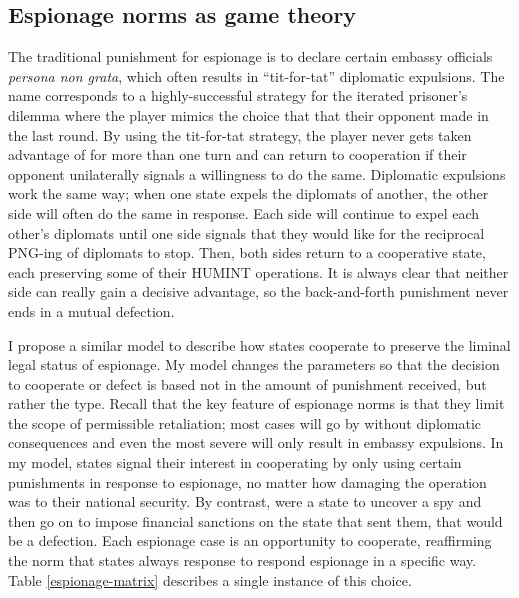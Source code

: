 \documentclass{memoir}
\begin{document}
\begin{refsegment}
\subsection{Espionage norms as game theory}
The traditional punishment for espionage is to declare certain embassy officials \emph{persona non grata}, which often results in ``tit-for-tat'' diplomatic expulsions. The name corresponds to a highly-successful strategy for the iterated prisoner's dilemma where the player mimics the choice that that their opponent made in the last round. By using the tit-for-tat strategy, the player never gets taken advantage of for more than one turn and can return to cooperation if their opponent unilaterally signals a willingness to do the same. Diplomatic expulsions work the same way; when one state expels the diplomats of another, the other side will often do the same in response. Each side will continue to expel each other's diplomats until one side signals that they would like for the reciprocal PNG-ing of diplomats to stop. Then, both sides return to a cooperative state, each preserving some of their HUMINT operations. It is always clear that neither side can really gain a decisive advantage, so the back-and-forth punishment never ends in a mutual defection.

I propose a similar model to describe how states cooperate to preserve the liminal legal status of espionage. My model changes the parameters so that the decision to cooperate or defect is based not in the amount of punishment received, but rather the type. Recall that the key feature of espionage norms is that they limit the scope of permissible retaliation; most cases will go by without diplomatic consequences and even the most severe will only result in embassy expulsions. In my model, states signal their interest in cooperating by only using certain punishments in response to espionage, no matter how damaging the operation was to their national security. By contrast, were a state to uncover a spy and then go on to impose financial sanctions on the state that sent them, that would be a defection. Each espionage case is an opportunity to cooperate, reaffirming the norm that states always response to respond espionage in a specific way. Table \ref{espionage-matrix} describes a single instance of this choice.


\end{refsegment}
\end{document}

